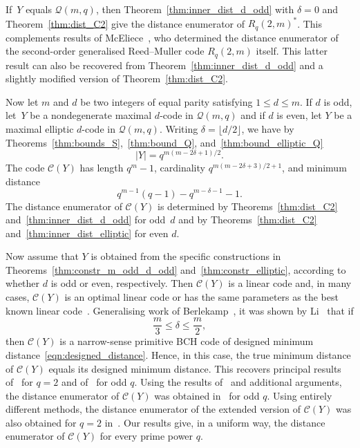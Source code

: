 \documentclass[10pt]{article}
\theoremstyle{definition}
\newcommand{\Q}{\mathscr{Q}}
\newcommand{\Cc}{\mathcal{C}}
\renewcommand{\d}{\delta}
\newcommand{\abs}[1]{\lvert#1\rvert}
\newcommand{\floor}[1]{\lfloor#1\rfloor}
\begin{document}
\par
If~$Y$ equals $\Q(m,q)$, then Theorem~\ref{thm:inner_dist_d_odd} with $\d=0$ and Theorem~\ref{thm:dist_C2} give the distance enumerator of $R_q(2,m)^*$. This complements results of McEliece~\cite{McE1969}, who determined the distance enumerator of the second-order generalised Reed--Muller code $R_q(2,m)$ itself. This latter result can also be recovered from Theorem~\ref{thm:inner_dist_d_odd} and a slightly modified version of Theorem~\ref{thm:dist_C2}.
\par
Now let $m$ and $d$ be two integers of equal parity satisfying $1\le d\le m$. If $d$ is odd, let~$Y$ be a nondegenerate maximal $d$-code in $\Q(m,q)$ and if $d$ is even, let $Y$ be a maximal elliptic $d$-code in $\Q(m,q)$. Writing $\delta=\floor{d/2}$, we have by Theorems~\ref{thm:bounds_S},~\ref{thm:bound_Q}, and~\ref{thm:bound_elliptic_Q}
\[
\abs{Y}=q^{m(m-2\delta+1)/2}.
\]
The code $\Cc(Y)$ has length $q^m-1$, cardinality $q^{m(m-2\delta+3)/2+1}$, and minimum distance
\begin{equation}
q^{m-1}(q-1)-q^{m-\delta-1}-1.   \label{eqn:designed_distance}
\end{equation}
The distance enumerator of $\Cc(Y)$ is determined by Theorems~\ref{thm:dist_C2} and~\ref{thm:inner_dist_d_odd} for odd~$d$ and by Theorems~\ref{thm:dist_C2} and~\ref{thm:inner_dist_elliptic} for even $d$.
\par
Now assume that $Y$ is obtained from the specific constructions in Theorems~\ref{thm:constr_m_odd_d_odd} and~\ref{thm:constr_elliptic}, according to whether $d$ is odd or even, respectively. Then $\Cc(Y)$ is a linear code and, in many cases, $\Cc(Y)$ is an optimal linear code or has the same parameters as the best known linear code~\cite{Gra2007}. Generalising work of Berlekamp~\cite{Ber1970}, it was shown by Li~\cite[Proposition~2.5]{Li2017} that if
\[
\frac{m}{3}\le \delta\le \frac{m}{2},
\]
then $\Cc(Y)$ is a narrow-sense primitive BCH code of designed minimum distance~\eqref{eqn:designed_distance}. Hence, in this case, the true minimum distance of $\Cc(Y)$ equals its designed minimum distance. This recovers principal results of~\cite{Ber1970} for $q=2$ and of~\cite{Li2017} for odd $q$. Using the results of~\cite{Sch2015} and additional arguments, the distance enumerator of $\Cc(Y)$ was obtained in~\cite{Li2017} for odd $q$. Using entirely different methods, the distance enumerator of the extended version of $\Cc(Y)$ was also obtained for $q=2$ in~\cite{Ber1970}. Our results give, in a uniform way, the distance enumerator of $\Cc(Y)$ for every prime power $q$. 
\end{document}
